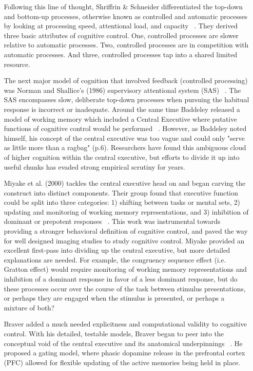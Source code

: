 \documentclass[phd,appendix,figures]{uithesis}
\begin{document}
Following this line of thought, Shriffrin \& Schneider differentiated the top-down and bottom-up processes, otherwise known as controlled and automatic processes by looking at processing speed, attentional load, and capacity ~\citep{Shiffrin1977}. 
They derived three basic attributes of cognitive control. One, controlled processes are slower relative to automatic processes. 
Two, controlled processes are in competition with automatic processes. 
And three, controlled processes tap into a shared limited resource.

The next major model of cognition that involved feedback (controlled processing) was Norman and Shallice's (1986) supervisory attentional system (SAS) ~\citep{Norman1986}. 
The SAS encompasses slow, deliberate top-down processes when pursuing the habitual response is incorrect or inadequate.
Around the same time Baddeley released a model of working memory which included a Central Executive where putative functions of cognitive control would be performed ~\citep{Baddeley1996}.
However, as Baddeley noted himself, his concept of the central executive was too vague and could only "serve as little more than a ragbag" (p.6). 
Researchers have found this ambiguous cloud of higher cognition within the central executive, but efforts to divide it up into useful chunks has evaded strong empirical scrutiny for years.

Miyake et al. (2000) tackles the central executive head on and began carving the construct into distinct components. 
Their group found that executive function could be split into three categories:
1) shifting between tasks or mental sets,
2) updating and monitoring of working memory representations, and
3) inhibition of dominant or prepotent responses ~\citep{Miyake2000}.
This work was instrumental towards providing a stronger behavioral definition of cognitive control, and paved the way for well designed imaging studies to study cognitive control.
Miyake provided an excellent first-pass into dividing up the central executive, but more detailed explanations are needed.
For example, the congruency sequence effect (i.e. Gratton effect) would require monitoring of working memory representations and inhibition of a dominant response in favor of a less dominant response, but do these processes occur over the course of the task between stimulus presentations, or perhaps they are engaged when the stimulus is presented, or perhaps a mixture of both?

Braver added a much needed explicitness and computational validity to cognitive control. With his detailed, testable models, Braver began to peer into the conceptual void of the central executive and its anatomical underpinnings ~\citep{Braver2001}. 
He proposed a gating model, where phasic dopamine release in the prefrontal cortex (PFC) allowed for flexible updating of the active memories being held in place.
\end{document}
